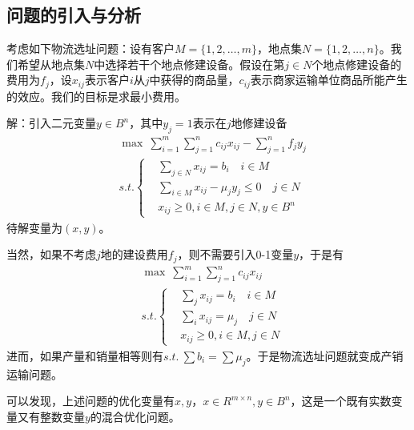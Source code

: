     \subsection{问题的引入与分析}
        \par
        考虑如下物流选址问题：设有客户$M=\{1,2,\ldots,m\}$，地点集$N=\{1,2,\ldots,n\}$。我们希望从地点集$N$中选择若干个地点修建设备。假设在第$j\in N$个地点修建设备的费用为$f_j$，设$x_{ij}$表示客户$i$从$j$中获得的商品量，$c_{ij}$表示商家运输单位商品所能产生的效应。我们的目标是求最小费用。
        \par
        解：引入二元变量$y \in B^n$，其中$y_j=1$表示在$j$地修建设备
        \begin{align*}
        &\mathop{\max}\ \mathop{\sum}\limits_{i=1}^m\mathop{\sum}\limits_{j=1}^n c_{ij}x_{ij}-\mathop{\sum}\limits_{j=1}^nf_jy_j\\
        &s.t.\left\{
        \begin{aligned}
        &\mathop{\sum}\limits_{j\in N} x_{ij}=b_i\quad i \in M\\
        &\mathop{\sum}\limits_{i\in M} x_{ij}-{\mu}_jy_j \leqslant 0\quad j \in N\\
        &x_{ij} \geqslant 0 , i \in M,j\in N,y \in B^n
        \end{aligned}
        \right.
        \end{align*}
        待解变量为$(x,y)$。\par
        当然，如果不考虑$j$地的建设费用$f_j$，则不需要引入0-1变量$y$，于是有
        \begin{align*}
        &\mathop{\max}\ \mathop{\sum}\limits_{i=1}^m\mathop{\sum}\limits_{j=1}^n c_{ij}x_{ij}\\
        &s.t.\left\{
        \begin{aligned}
        &\mathop{\sum}\limits_{j} x_{ij}=b_i \quad i \in M\\
        &\mathop{\sum}\limits_{i} x_{ij}={\mu}_j \quad j \in N\\
        &x_{ij} \geqslant 0 , i \in M,j\in N
        \end{aligned}
        \right.
        \end{align*}
        进而，如果产量和销量相等则有$s.t.\ {\sum}b_i={\sum}{\mu}_j$。于是物流选址问题就变成产销运输问题。
        \par
        可以发现，上述问题的优化变量有$x,y$，$x \in R^{m\times n},y \in B^n$，这是一个既有实数变量又有整数变量$y$的混合优化问题。
